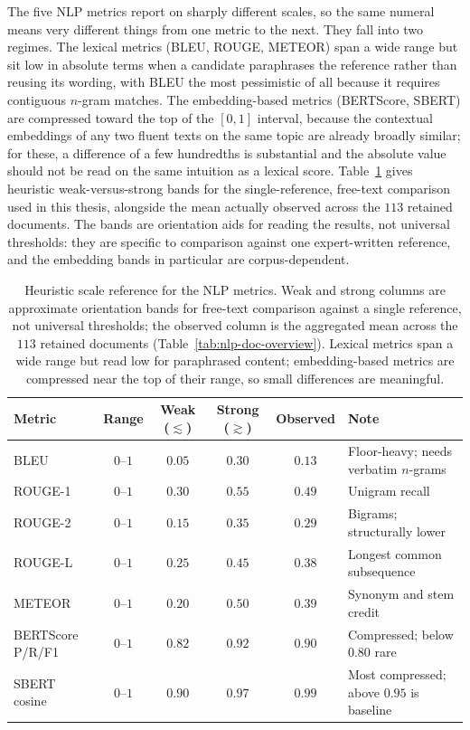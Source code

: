 The five NLP metrics report on sharply different scales, so the
same numeral means very different things from one metric to the
next. They fall into two regimes. The lexical metrics (BLEU,
ROUGE, METEOR) span a wide range but sit low in absolute terms
when a candidate paraphrases the reference rather than reusing
its wording, with BLEU the most pessimistic of all because it
requires contiguous $n$-gram matches. The embedding-based
metrics (BERTScore, SBERT) are compressed toward the top of
the $[0,1]$ interval, because the contextual embeddings of any
two fluent texts on the same topic are already broadly similar;
for these, a difference of a few hundredths is substantial and
the absolute value should not be read on the same intuition as
a lexical score. Table~\ref{tab:metric-scales} gives heuristic
weak-versus-strong bands for the single-reference, free-text
comparison used in this thesis, alongside the mean actually
observed across the $113$ retained documents. The bands are
orientation aids for reading the results, not universal
thresholds: they are specific to comparison against one
expert-written reference, and the embedding bands in particular
are corpus-dependent.

\begin{table}[H]
\centering
\begin{tabularx}{\linewidth}{@{}l c c c c X@{}}
\toprule
Metric & Range & Weak ($\lesssim$) & Strong ($\gtrsim$) & Observed & Note \\
\midrule
BLEU              & $0$--$1$ & $0.05$ & $0.30$ & $0.13$ & Floor-heavy; needs verbatim $n$-grams \\
ROUGE-1           & $0$--$1$ & $0.30$ & $0.55$ & $0.49$ & Unigram recall \\
ROUGE-2           & $0$--$1$ & $0.15$ & $0.35$ & $0.29$ & Bigrams; structurally lower \\
ROUGE-L           & $0$--$1$ & $0.25$ & $0.45$ & $0.38$ & Longest common subsequence \\
METEOR            & $0$--$1$ & $0.20$ & $0.50$ & $0.39$ & Synonym and stem credit \\
\midrule
BERTScore P/R/F1  & $0$--$1$ & $0.82$ & $0.92$ & $0.90$ & Compressed; below $0.80$ rare \\
SBERT cosine      & $0$--$1$ & $0.90$ & $0.97$ & $0.99$ & Most compressed; above $0.95$ is baseline \\
\bottomrule
\end{tabularx}
\caption{Heuristic scale reference for the NLP metrics. Weak and
strong columns are approximate orientation bands for free-text
comparison against a single reference, not universal thresholds;
the observed column is the aggregated mean across the $113$
retained documents (Table~\ref{tab:nlp-doc-overview}). Lexical
metrics span a wide range but read low for paraphrased content;
embedding-based metrics are compressed near the top of their
range, so small differences are meaningful.}
\label{tab:metric-scales}
\end{table}

